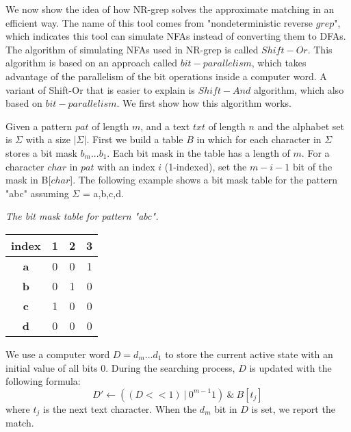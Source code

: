We now show the idea of how NR-grep solves the approximate matching in an efficient way. The name of this tool comes from "nondeterministic reverse $grep$", which indicates this tool can simulate NFAs instead of converting them to DFAs. The algorithm of  simulating NFAs used in NR-grep is called $Shift-Or$. This algorithm is based on an approach called $bit-parallelism$, which takes advantage of the parallelism of the bit operations inside a computer word. A variant of Shift-Or that is easier to explain is $Shift-And$ algorithm, which also based on $bit-parallelism$. We first show how this algorithm works. 

Given a pattern $pat$ of length $m$,  and a text $txt$ of length $n$ and the alphabet set is $\Sigma$ with a size $|\Sigma|$. First we build a table $B$ in which for each character in $\Sigma$ stores a bit mask $b_m...b_1$. Each bit mask in the table has a length of $m$. For a character $char$ in $pat$ with an index $i$ (1-indexed), set the $m-i-1$ bit of the mask in B[$char$]. The following example shows a bit mask table for the pattern "abc" assuming $\Sigma$ = {a,b,c,d}.


\begin{example}\emph{The bit mask table for pattern "abc".}

\begin{table}[H]
	\centering
	\begin{tabular}{|c|c|c|c|}
		\hline
		index      & 1                        & 2                        & 3                        \\ \hline
		\textbf{a} & 0                        & 0                        & {\color[HTML]{3531FF} 1} \\ \hline
		\textbf{b} & 0                        & {\color[HTML]{3531FF} 1} & 0                        \\ \hline
		\textbf{c} & {\color[HTML]{3531FF} 1} & 0                        & 0                        \\ \hline
		\textbf{d} & 0                        & 0                        & 0                        \\ \hline
	\end{tabular}
	\label{table-bitmask}
\end{table}
\end{example}

We use a computer word $D = d_m...d_1$ to store the current active state with an initial value of all bits 0. During the searching process, $D$ is updated with the following formula: 
$$D' \leftarrow ((D << 1) \ | \ 0^{m-1}1) \ \& \ B[t_j]$$
where $t_j$ is the next text character.  When the $d_m$ bit in $D$ is set, we report the match. 

